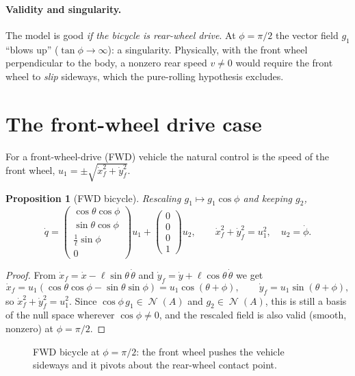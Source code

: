 \documentclass[11pt,a4paper]{article}
\DeclareMathOperator{\Ker}{\mathcal{N}}
\newcommand{\wheel}[3]{\begin{scope}[shift={#1},rotate=#2]
  \draw[fill=#3,rounded corners=1pt] (-0.4,-0.12) rectangle (0.4,0.12);\end{scope}}
\theoremstyle{definition}
\theoremstyle{plain}
\newtheorem{proposition}[definition]{Proposition}
\theoremstyle{remark}
\begin{document}
\paragraph{Validity and singularity.} The model is good \emph{if the bicycle is rear-wheel drive}. At $\phi=\pi/2$ the vector field $g_1$ ``blows up'' ($\tan\phi\to\infty$): a singularity. Physically, with the front wheel perpendicular to the body, a nonzero rear speed $v\neq0$ would require the front wheel to \emph{slip} sideways, which the pure-rolling hypothesis excludes.

\section{The front-wheel drive case}

For a front-wheel-drive (FWD) vehicle the natural control is the speed of the front wheel, $u_1=\pm\sqrt{\dot x_f^2+\dot y_f^2}$.

\begin{proposition}[FWD bicycle]
Rescaling $g_1\mapsto g_1\cos\phi$ and keeping $g_2$,
\[
\dot q=\begin{pmatrix}\cos\theta\cos\phi\\ \sin\theta\cos\phi\\ \frac1\ell\sin\phi\\ 0\end{pmatrix}u_1+\begin{pmatrix}0\\0\\0\\1\end{pmatrix}u_2,
\qquad \dot x_f^2+\dot y_f^2=u_1^2,\quad u_2=\dot\phi .
\]
\end{proposition}
\begin{proof}
From $\dot x_f=\dot x-\ell\sin\theta\,\dot\theta$ and $\dot y_f=\dot y+\ell\cos\theta\,\dot\theta$ we get
\[
\dot x_f=u_1(\cos\theta\cos\phi-\sin\theta\sin\phi)=u_1\cos(\theta+\phi),\qquad
\dot y_f=u_1\sin(\theta+\phi),
\]
so $\dot x_f^2+\dot y_f^2=u_1^2$. Since $\cos\phi\,g_1\in\Ker(A)$ and $g_2\in\Ker(A)$, this is still a basis of the null space wherever $\cos\phi\ne0$, and the rescaled field is also valid (smooth, nonzero) at $\phi=\pi/2$.
\end{proof}

\begin{figure}[H]
\centering
{}
\caption{FWD bicycle at $\phi=\pi/2$: the front wheel pushes the vehicle sideways and it pivots about the rear-wheel contact point.}
\label{fig:pivot}
\end{figure}
\end{document}
